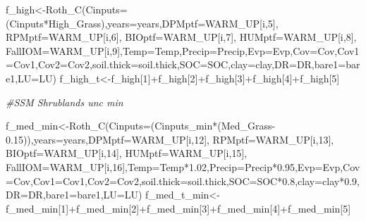 \documentclass[
  10pt,
  b5paper,
]{book}
\newenvironment{Shaded}{\begin{snugshade}}{\end{snugshade}}
\newcommand{\AttributeTok}[1]{\textcolor[rgb]{0.77,0.63,0.00}{#1}}
\newcommand{\CommentTok}[1]{\textcolor[rgb]{0.56,0.35,0.01}{\textit{#1}}}
\newcommand{\DecValTok}[1]{\textcolor[rgb]{0.00,0.00,0.81}{#1}}
\newcommand{\FloatTok}[1]{\textcolor[rgb]{0.00,0.00,0.81}{#1}}
\newcommand{\FunctionTok}[1]{\textcolor[rgb]{0.00,0.00,0.00}{#1}}
\newcommand{\NormalTok}[1]{#1}
\newcommand{\OtherTok}[1]{\textcolor[rgb]{0.56,0.35,0.01}{#1}}
\newcommand{\SpecialCharTok}[1]{\textcolor[rgb]{0.00,0.00,0.00}{#1}}
\begin{document}
\begin{Shaded}
\begin{Highlighting}[]
\NormalTok{f\_high}\OtherTok{\textless{}{-}}\FunctionTok{Roth\_C}\NormalTok{(}\AttributeTok{Cinputs=}\NormalTok{(Cinputs}\SpecialCharTok{*}\NormalTok{High\_Grass),}\AttributeTok{years=}\NormalTok{years,}\AttributeTok{DPMptf=}\NormalTok{WARM\_UP[i,}\DecValTok{5}\NormalTok{], }\AttributeTok{RPMptf=}\NormalTok{WARM\_UP[i,}\DecValTok{6}\NormalTok{], }\AttributeTok{BIOptf=}\NormalTok{WARM\_UP[i,}\DecValTok{7}\NormalTok{], }\AttributeTok{HUMptf=}\NormalTok{WARM\_UP[i,}\DecValTok{8}\NormalTok{], }\AttributeTok{FallIOM=}\NormalTok{WARM\_UP[i,}\DecValTok{9}\NormalTok{],}\AttributeTok{Temp=}\NormalTok{Temp,}\AttributeTok{Precip=}\NormalTok{Precip,}\AttributeTok{Evp=}\NormalTok{Evp,}\AttributeTok{Cov=}\NormalTok{Cov,}\AttributeTok{Cov1=}\NormalTok{Cov1,}\AttributeTok{Cov2=}\NormalTok{Cov2,}\AttributeTok{soil.thick=}\NormalTok{soil.thick,}\AttributeTok{SOC=}\NormalTok{SOC,}\AttributeTok{clay=}\NormalTok{clay,}\AttributeTok{DR=}\NormalTok{DR,}\AttributeTok{bare1=}\NormalTok{bare1,}\AttributeTok{LU=}\NormalTok{LU)}
\NormalTok{f\_high\_t}\OtherTok{\textless{}{-}}\NormalTok{f\_high[}\DecValTok{1}\NormalTok{]}\SpecialCharTok{+}\NormalTok{f\_high[}\DecValTok{2}\NormalTok{]}\SpecialCharTok{+}\NormalTok{f\_high[}\DecValTok{3}\NormalTok{]}\SpecialCharTok{+}\NormalTok{f\_high[}\DecValTok{4}\NormalTok{]}\SpecialCharTok{+}\NormalTok{f\_high[}\DecValTok{5}\NormalTok{]}

\CommentTok{\#SSM Shrublands unc min}

\NormalTok{f\_med\_min}\OtherTok{\textless{}{-}}\FunctionTok{Roth\_C}\NormalTok{(}\AttributeTok{Cinputs=}\NormalTok{(Cinputs\_min}\SpecialCharTok{*}\NormalTok{(Med\_Grass}\FloatTok{{-}0.15}\NormalTok{)),}\AttributeTok{years=}\NormalTok{years,}\AttributeTok{DPMptf=}\NormalTok{WARM\_UP[i,}\DecValTok{12}\NormalTok{], }\AttributeTok{RPMptf=}\NormalTok{WARM\_UP[i,}\DecValTok{13}\NormalTok{], }\AttributeTok{BIOptf=}\NormalTok{WARM\_UP[i,}\DecValTok{14}\NormalTok{], }\AttributeTok{HUMptf=}\NormalTok{WARM\_UP[i,}\DecValTok{15}\NormalTok{], }\AttributeTok{FallIOM=}\NormalTok{WARM\_UP[i,}\DecValTok{16}\NormalTok{],}\AttributeTok{Temp=}\NormalTok{Temp}\SpecialCharTok{*}\FloatTok{1.02}\NormalTok{,}\AttributeTok{Precip=}\NormalTok{Precip}\SpecialCharTok{*}\FloatTok{0.95}\NormalTok{,}\AttributeTok{Evp=}\NormalTok{Evp,}\AttributeTok{Cov=}\NormalTok{Cov,}\AttributeTok{Cov1=}\NormalTok{Cov1,}\AttributeTok{Cov2=}\NormalTok{Cov2,}\AttributeTok{soil.thick=}\NormalTok{soil.thick,}\AttributeTok{SOC=}\NormalTok{SOC}\SpecialCharTok{*}\FloatTok{0.8}\NormalTok{,}\AttributeTok{clay=}\NormalTok{clay}\SpecialCharTok{*}\FloatTok{0.9}\NormalTok{,}\AttributeTok{DR=}\NormalTok{DR,}\AttributeTok{bare1=}\NormalTok{bare1,}\AttributeTok{LU=}\NormalTok{LU)}
\NormalTok{f\_med\_t\_min}\OtherTok{\textless{}{-}}\NormalTok{f\_med\_min[}\DecValTok{1}\NormalTok{]}\SpecialCharTok{+}\NormalTok{f\_med\_min[}\DecValTok{2}\NormalTok{]}\SpecialCharTok{+}\NormalTok{f\_med\_min[}\DecValTok{3}\NormalTok{]}\SpecialCharTok{+}\NormalTok{f\_med\_min[}\DecValTok{4}\NormalTok{]}\SpecialCharTok{+}\NormalTok{f\_med\_min[}\DecValTok{5}\NormalTok{]}


\end{Highlighting}
\end{Shaded}
\end{document}
